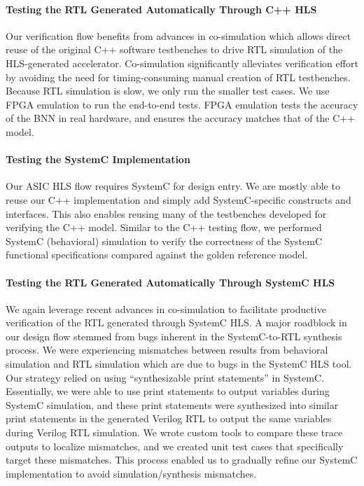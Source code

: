\paragraph{Testing the RTL Generated Automatically Through C++ HLS}
Our verification flow benefits from advances in co-simulation which
allows direct reuse of the original C++ software testbenches to drive RTL
simulation of the HLS-generated accelerator. Co-simulation significantly
alleviates verification effort by avoiding the need for timing-consuming
manual creation of RTL testbenches. Because RTL simulation is slow, we
only run the smaller test cases. We use FPGA emulation to run the
end-to-end tests. FPGA emulation tests the accuracy of the BNN in real
hardware, and ensures the accuracy matches that of the C++ model.

\paragraph{Testing the SystemC Implementation}
Our ASIC HLS flow requires SystemC for design entry. We are mostly able
to reuse our C++ implementation and simply add SystemC-specific
constructs and interfaces. This also enables reusing many of the
testbenches developed for verifying the C++ model. Similar to the C++
testing flow, we performed SystemC (behavioral) simulation to verify the
correctness of the SystemC functional specifications compared against the
golden reference model.

\paragraph{Testing the RTL Generated Automatically Through SystemC HLS}
We again leverage recent advances in co-simulation to facilitate
productive verification of the RTL generated through SystemC HLS. A major
roadblock in our design flow stemmed from bugs inherent in the
SystemC-to-RTL synthesis process. We were experiencing mismatches between
results from behavioral simulation and RTL simulation which are due to
bugs in the SystemC HLS tool. Our strategy relied on using
``synthesizable print statements'' in SystemC. Essentially, we were able
to use print statements to output variables during SystemC simulation,
and these print statements were synthesized into similar print statements
in the generated Verilog RTL to output the same variables during Verilog
RTL simulation. We wrote custom tools to compare these trace outputs to
localize mismatches, and we created unit test cases that specifically
target these mismatches. This process enabled us to gradually refine our
SystemC implementation to avoid simulation/synthesis mismatches.

